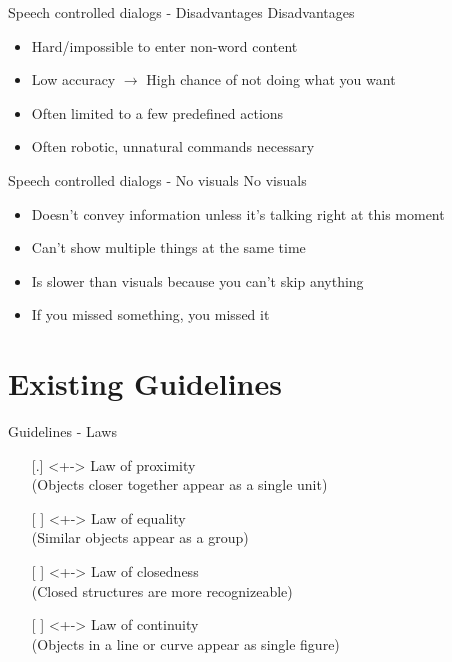 \documentclass[
  10pt
, handout
]{beamer}
\begin{document}
\begin{frame}{Speech controlled dialogs - Disadvantages}
  Disadvantages

  \begin{itemize}
    \item Hard/impossible to enter non-word content
    \item Low accuracy $\rightarrow$ High chance of not doing what you want
    \item Often limited to a few predefined actions
    \item Often robotic, unnatural commands necessary
  \end{itemize}
\end{frame}

\begin{frame}{Speech controlled dialogs - No visuals}
  No visuals

  \begin{itemize}
    \item Doesn't convey information unless it's talking right at this moment
    \item Can't show multiple things at the same time
    \item Is slower than visuals because you can't skip anything
    \item If you missed something, you missed it
  \end{itemize}
\end{frame}

\section{Existing Guidelines}  %

\begin{frame}{Guidelines - Laws}
  \begin{itemize}
    \item[{[.]}]<+-> Law of proximity \\ (Objects closer together appear as a single unit)
    \item[{[ ]}]<+-> Law of equality \\ (Similar objects appear as a group)
    \item[{[ ]}]<+-> Law of closedness \\ (Closed structures are more recognizeable)
    \item[{[ ]}]<+-> Law of continuity \\ (Objects in a line or curve appear as single figure)
  \end{itemize}
\end{frame}
\end{document}
